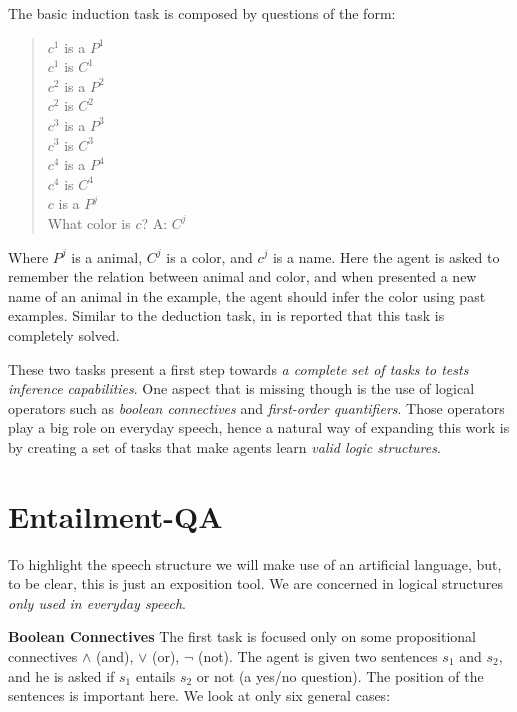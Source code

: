 The basic induction task is composed by questions of the form:

\begin{quote} 
\centering 
$c^{1}$ is a $P^{1}$\\
$c^{1}$ is $C^{1}$\\
$c^{2}$ is a $P^{2}$\\
$c^{2}$ is $C^{2}$\\
$c^{3}$ is a $P^{3}$\\
$c^{3}$ is $C^{3}$\\
$c^{4}$ is a $P^{4}$\\
$c^{4}$ is $C^{4}$\\
$c$ is a $P^{j}$\\
What color is $c$? A: $C^{j}$\\
\end{quote}

Where $P^{j}$ is a animal, $C^{j}$ is a color, and $c^{j}$ is a name. Here the agent is asked to remember the relation between animal and color, and when presented a new name of an animal in the example, the agent should infer the color using past examples. Similar to the deduction task, in \cite{WestonBCM15} is reported that this task is completely solved.

These two tasks present a first step towards \textit{a complete set of tasks to tests inference capabilities}. One aspect that is missing though is the use of logical operators such as \textit{boolean connectives} and \textit{first-order quantifiers}. Those operators play a big role on everyday speech, hence a natural way of expanding this work is by creating a set of tasks that make agents learn \textit{valid logic structures}.

\section{Entailment-QA}
\label{ch:03-EQA}

To highlight the speech structure we will make use of an artificial language, but, to be clear, this is just an exposition tool. We are concerned in logical structures \textit{only used in everyday speech}.

\textbf{Boolean Connectives} The first task is focused only on some propositional connectives $\land$ (and), $\lor$ (or), $\lnot$ (not). The agent is given two sentences $s_1$ and $s_2$, and he is asked if $s_1$ entails $s_2$ or not (a yes/no question). The position of the sentences is important here. We look at only six general cases:

